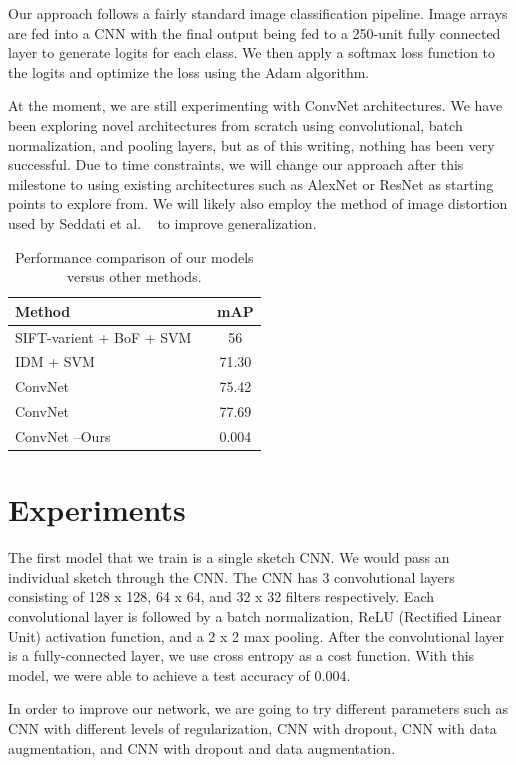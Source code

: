 \documentclass[10pt,twocolumn,letterpaper]{article}
\begin{document}
Our approach follows a fairly standard image classification pipeline. Image arrays are fed into a CNN with the final output being fed to a 250-unit fully connected layer to generate logits for each class. We then apply a softmax loss function to the logits and optimize the loss using the Adam algorithm.

At the moment, we are still experimenting with ConvNet architectures. We have been exploring novel architectures from scratch using convolutional, batch normalization, and pooling layers, but as of this writing, nothing has been very successful. Due to time constraints, we will change our approach after this milestone to using existing architectures such as AlexNet or ResNet as starting points to explore from. We will likely also employ the method of image distortion used by Seddati et al. ~\cite{seddati2015deepsketch} to improve generalization.

\begin{table}[h]
\begin{center}
\begin{tabular}{|l|c|}
\hline
Method & mAP \\
\hline\hline
SIFT-varient + BoF + SVM  ~\cite{eitz2012hdhso}  &  56 \\
IDM + SVM ~\cite{yesilbek2015svm} & 71.30 \\
ConvNet ~\cite{seddati2015deepsketch}  & 75.42\\
ConvNet ~\cite{seddati2016deepsketch} & 77.69\\
ConvNet --Ours & 0.004 \\
\hline
\end{tabular}
\end{center}
\caption{Performance comparison of our models versus other methods.}
\end{table}


\section{Experiments}
The first model that we train is a single sketch CNN. We would pass an individual sketch through the CNN. The CNN has 3 convolutional layers consisting of 128 x 128, 64 x 64, and 32 x 32 filters respectively. Each convolutional layer is followed by a batch normalization, ReLU (Rectified Linear Unit) activation function, and a 2 x 2 max pooling. After the convolutional layer is a fully-connected layer, we use cross  entropy as a cost function. With this model, we were able to achieve a test accuracy of 0.004. 

In order to improve our network, we are going to try different parameters such as CNN with different levels of regularization, CNN with dropout, CNN with data augmentation, and CNN with dropout and data augmentation. 

{\small


}
\end{document}
